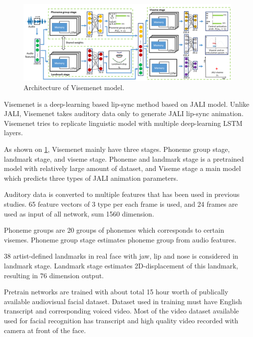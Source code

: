\documentclass[10pt,twocolumn,letterpaper]{article}
\begin{document}
\begin{figure}
   \centering
   \includegraphics[width=1.0\linewidth]{VisemenetArchitecture}
   \caption{Architecture of Visemenet model.}
   \label{fig:VisemenetArchitecture}
\end{figure}



Visemenet is a deep-learning based lip-sync method based on JALI model. Unlike JALI, Visemenet takes auditory data only to generate JALI lip-sync animation. Visemenet tries to replicate linguistic model with multiple deep-learning LSTM layers.

As shown on \cref{fig:VisemenetArchitecture}, Visemenet mainly have three stages. Phoneme group stage, landmark stage, and viseme stage. Phoneme and landmark stage is a pretrained model with relatively large amount of dataset, and Viseme stage a main model which predicts three types of JALI animation parameters.

Auditory data is converted to multiple features that has been used in previous studies. 65 feature vectors of 3 type per each frame is used, and 24 frames are used as input of all network, sum 1560 dimension.

Phoneme groups are 20 groups of phonemes which corresponds to certain visemes. Phoneme group stage estimates phoneme group from audio features.

38 artist-defined landmarks in real face with jaw, lip and nose is considered in landmark stage. Landmark stage estimates 2D-displacement of this landmark, resulting in 76 dimension output.

Pretrain networks are trained with about total 15 hour worth of publically available audiovisual facial dataset. Dataset used in training must have English transcript and corresponding voiced video. Most of the video dataset available used for facial recognition has transcript and high quality video recorded with camera at front of the face.
\end{document}
